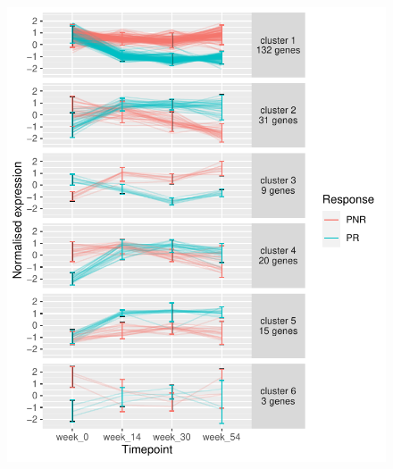 \begin{outline}
\begin{figure}
    \centering
    \includegraphics[width=1.0\textwidth,page=1]{mainmatter/figures/chapter_04/plot_gene_set_enrichment.spline_cluster_trajectories.pdf}
    \caption{}
    \label{fig:multipants_dge_spline_cluster_trajectories}
\end{figure}


\end{outline}
